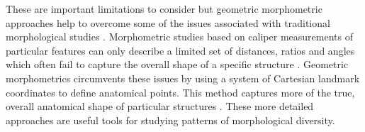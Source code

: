 	These are important limitations to consider but geometric morphometric\\ approaches help to overcome some of the issues associated with traditional morphological studies \citep{Adams2004}. Morphometric studies based on caliper measurements of particular features can only describe a limited set of distances, ratios and angles which often fail to capture the overall shape of a specific structure \citep{Slice2007}. Geometric morphometrics circumvents these issues by using a system of Cartesian landmark coordinates to define anatomical points. This method captures more of the true, overall anatomical shape of particular structures \citep{Mitteroecker2009}. These more detailed approaches are useful tools for studying patterns of morphological diversity.
	

	
